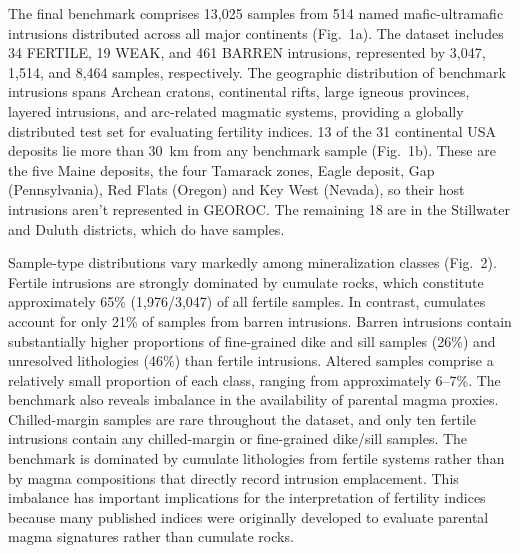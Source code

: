 \documentclass[10pt,twocolumn,letterpaper]{article}
\begin{document}
The final benchmark comprises 13,025 samples from 514 named mafic-ultramafic intrusions distributed across all major continents (Fig.~1a). The dataset includes 34 FERTILE, 19 WEAK, and 461 BARREN intrusions, represented by 3,047, 1,514, and 8,464 samples, respectively. The geographic distribution of benchmark intrusions spans Archean cratons, continental rifts, large igneous provinces, layered intrusions, and arc-related magmatic systems, providing a globally distributed test set for evaluating fertility indices. 13 of the 31 continental USA deposits lie more than 30~km from any benchmark sample (Fig.~1b). These are the five Maine deposits, the four Tamarack zones, Eagle deposit, Gap (Pennsylvania), Red Flats (Oregon) and Key West (Nevada), so their host intrusions aren't represented in GEOROC. The remaining 18 are in the Stillwater and Duluth districts, which do have samples.

Sample-type distributions vary markedly among mineralization classes (Fig.~2). Fertile intrusions are strongly dominated by cumulate rocks, which constitute approximately 65\% (1,976/3,047) of all fertile samples. In contrast, cumulates account for only 21\% of samples from barren intrusions. Barren intrusions contain substantially higher proportions of fine-grained dike and sill samples (26\%) and unresolved lithologies (46\%) than fertile intrusions. Altered samples comprise a relatively small proportion of each class, ranging from approximately 6--7\%. The benchmark also reveals imbalance in the availability of parental magma proxies. Chilled-margin samples are rare throughout the dataset, and only ten fertile intrusions contain any chilled-margin or fine-grained dike/sill samples. The benchmark is dominated by cumulate lithologies from fertile systems rather than by magma compositions that directly record intrusion emplacement. This imbalance has important implications for the interpretation of fertility indices because many published indices were originally developed to evaluate parental magma signatures rather than cumulate rocks.
\end{document}
